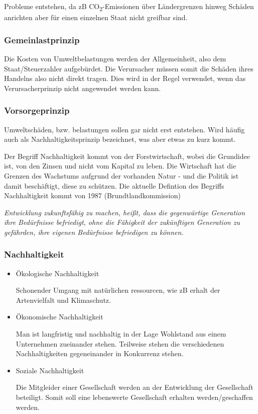 \documentclass[11pt]{scrbook}
\begin{document}
Probleme entstehen, da zB CO\textsubscript{2}-Emissionen über Ländergrenzen hinweg Schäden anrichten aber für einen einzelnen Staat nicht greifbar sind.

\subsubsection{Gemeinlastprinzip}
Die Kosten von Umweltbelastungen werden der Allgemeinheit, also dem Staat/Steuerzahler aufgebürdet.
Die Verursacher müssen somit die Schäden ihres Handelns also nicht direkt tragen.
Dies wird in der Regel verwendet, wenn das Verursacherprinzip nicht angewendet werden kann.

\subsubsection{Vorsorgeprinzip}
Umweltschäden, bzw. belastungen sollen gar nicht erst entstehen.
Wird häufig auch als Nachhaltigkeitsprinzip bezeichnet, was aber etwas zu kurz kommt.

Der Begriff Nachhaltigkeit kommt von der Forstwirtschaft, wobei die Grundidee ist, von den Zinsen und nicht vom Kapital zu leben.
Die Wirtschaft hat die Grenzen des Wachstums aufgrund der vorhanden Natur - und die Politik ist damit beschäftigt, diese zu schützen.
Die aktuelle Defintion des Begriffs Nachhaltigkeit kommt von 1987 (Brundtlandkommission)

\textit{Entwicklung zukunftsfähig zu machen, heißt, dass die gegenwärtige Generation ihre Bedürfnisse befriedigt, ohne die Fähigkeit der zukünftigen Generation zu gefährden, ihre eigenen Bedürfnisse befriedigen zu können.}


\subsubsection{Nachhaltigkeit}
\label{nachhaltig}
\begin{itemize}
	\item Ökologische Nachhaltigkeit
		
		Schonender Umgang mit natürlichen ressourcen, wie zB erhalt der Artenvielfalt und Klimaschutz.

	\item Ökonomische Nachhaltigkeit

		Man ist langfristig und nachhaltig in der Lage Wohlstand aus einem Unternehmen zueinander stehen.
		Teilweise stehen die verschiedenen Nachhaltigkeiten gegeneinander in Konkurrenz stehen.

	\item Soziale Nachhaltigkeit

		Die Mitgleider einer Gesellschaft werden an der Entwicklung der Gesellschaft beteiligt.
		Somit soll eine lebenswerte Gesellschaft erhalten werden/geschaffen werden.
		
\end{itemize}
\end{document}
